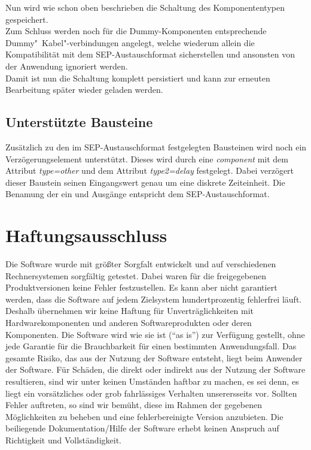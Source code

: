 \documentclass[12pt,a4paper]{scrartcl}
\newcommand{\fckSEPFormat}{SEP-Austauschformat\xspace}
\begin{document}
Nun wird wie schon oben beschrieben die Schaltung des Komponententypen gespeichert. \\
Zum Schluss werden noch für die Dummy-Komponenten entsprechende Dummy"~Kabel"-verbindungen angelegt, welche wiederum allein die Kompatibilität mit dem \fckSEPFormat sicherstellen und ansonsten von der Anwendung ignoriert werden. \\
Damit ist nun die Schaltung komplett persistiert und kann zur erneuten Bearbeitung später wieder geladen werden.

\subsection{Unterstützte Bausteine}
Zusätzlich zu den im \fckSEPFormat festgelegten Bausteinen wird noch ein Verzögerungselement unterstützt. Dieses wird durch eine \textit{component} mit dem Attribut \textit{type=other} und dem Attribut \textit{type2=delay} festgelegt. Dabei verzögert dieser Baustein seinen Eingangswert genau um eine diskrete Zeiteinheit. Die Benamung der ein und Ausgänge entspricht dem \fckSEPFormat.

% 
%
\newpage
\section{Haftungsausschluss}
Die Software wurde mit größter Sorgfalt entwickelt und auf verschiedenen Rechnersystemen sorgfältig getestet. Dabei waren für die freigegebenen Produktversionen keine Fehler festzustellen. Es kann aber nicht garantiert werden, dass die Software auf jedem Zielsystem hundertprozentig fehlerfrei läuft. Deshalb übernehmen wir keine Haftung für Unverträglichkeiten mit Hardwarekomponenten und anderen Softwareprodukten oder deren Komponenten. Die Software wird wie sie ist (``as is'') zur Verfügung gestellt, ohne jede Garantie für die Brauchbarkeit für einen bestimmten Anwendungsfall. Das gesamte Risiko, das aus der Nutzung der Software entsteht, liegt beim Anwender der Software. Für Schäden, die direkt oder indirekt aus der Nutzung der Software resultieren, sind wir unter keinen Umständen haftbar zu machen, es sei denn, es liegt ein vorsätzliches oder grob fahrlässiges Verhalten unserersseits vor. Sollten Fehler auftreten, so sind wir bemüht, diese im Rahmen der gegebenen Möglichkeiten zu beheben und eine fehlerbereinigte Version anzubieten. Die beiliegende Dokumentation/Hilfe der Software erhebt keinen Anspruch auf Richtigkeit und Vollständigkeit.
\end{document}

